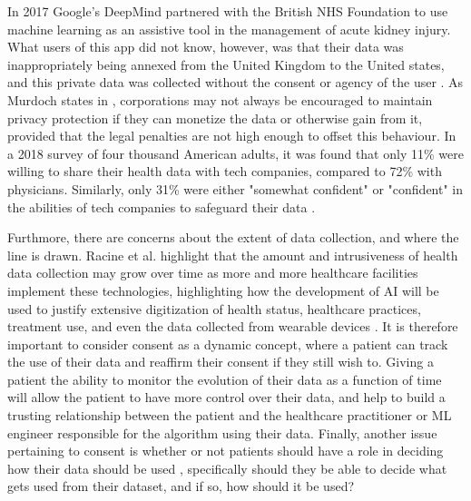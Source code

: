 \documentclass[12pt]{article}
\begin{document}
In 2017 Google's DeepMind partnered with the British NHS Foundation to use machine learning as an assistive tool in the management of acute kidney injury. What users of this app did not know, however, was that their data was inappropriately being annexed from the United Kingdom to the United states, and this private data was collected without the consent or agency of the user \cite{Gerke_2020,Murdoch_2021}. As Murdoch states in \cite{Murdoch_2021}, corporations may not always be encouraged to maintain privacy protection if they can monetize the data or otherwise gain from it, provided that the legal penalties are not high enough to offset this behaviour. In a 2018 survey of four thousand American adults, it was found that only 11\% were willing to share their health data with tech companies, compared to 72\% with physicians. Similarly, only 31\% were either "somewhat confident" or "confident" in the abilities of tech companies to safeguard their data \cite{Murdoch_2021}.\

Furthmore, there are concerns about the extent of data collection, and where the line is drawn. Racine et al. highlight that the amount and intrusiveness of health data collection may grow over time as more and more healthcare facilities implement these technologies, highlighting how the development of AI will be used to justify extensive digitization of health status, healthcare practices, treatment use, and even the data collected from wearable devices \cite{Racine_2019}. It is therefore important to consider consent as a dynamic concept, where a patient can track the use of their data and reaffirm their consent if they still wish to. Giving a patient the ability to monitor the evolution of their data as a function of time will allow the patient to have more control over their data, and help to build a trusting relationship between the patient and the healthcare practitioner or ML engineer responsible for the algorithm using their data. Finally, another issue pertaining to consent is whether or not patients should have a role in deciding how their data should be used \cite{Price_2019}, specifically should they be able to decide what gets used from their dataset, and if so, how should it be used?

\end{document}
